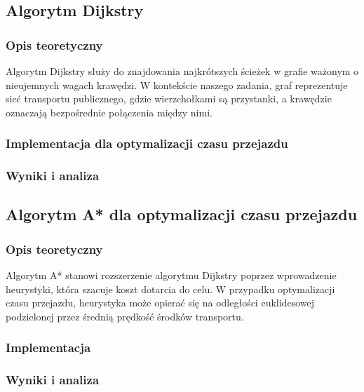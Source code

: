 \documentclass[12pt,a4paper]{article}
\begin{document}
\subsection{Algorytm Dijkstry}
\subsubsection{Opis teoretyczny}
Algorytm Dijkstry służy do znajdowania najkrótszych ścieżek w grafie ważonym o nieujemnych wagach krawędzi. W kontekście naszego zadania, graf reprezentuje sieć transportu publicznego, gdzie wierzchołkami są przystanki, a krawędzie oznaczają bezpośrednie połączenia między nimi.

\subsubsection{Implementacja dla optymalizacji czasu przejazdu}

\subsubsection{Wyniki i analiza}

\subsection{Algorytm A* dla optymalizacji czasu przejazdu}
\subsubsection{Opis teoretyczny}
Algorytm A* stanowi rozszerzenie algorytmu Dijkstry poprzez wprowadzenie heurystyki, która szacuje koszt dotarcia do celu. W przypadku optymalizacji czasu przejazdu, heurystyka może opierać się na odległości euklidesowej podzielonej przez średnią prędkość środków transportu.

\subsubsection{Implementacja}

\subsubsection{Wyniki i analiza}
\end{document}
